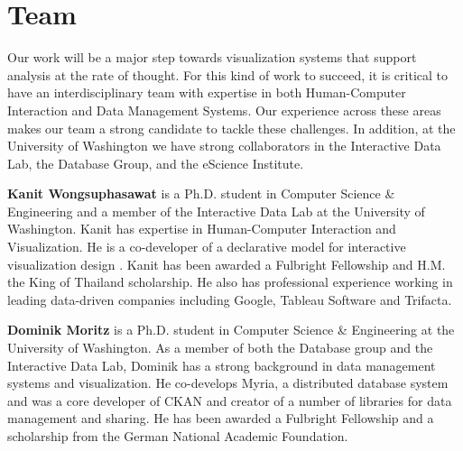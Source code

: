 \section*{Team}

Our work will be a major step towards visualization systems that support analysis at the rate of thought.  For this kind of work to succeed, it is critical to have an interdisciplinary team with expertise in both Human-Computer Interaction and Data Management Systems. Our experience across these areas makes our team a strong candidate to tackle these challenges.  In addition, at the University of Washington we have strong collaborators in the Interactive Data Lab, the Database Group, and the eScience Institute.

\textbf{Kanit Wongsuphasawat} is a Ph.D. student in Computer Science \& Engineering and a member of the Interactive Data Lab at the University of Washington.  Kanit has expertise in Human-Computer Interaction and Visualization.  He is a co-developer of a declarative model for interactive visualization design \cite{satyanarayan:reactive-vega}.  Kanit has been awarded a Fulbright Fellowship and H.M. the King of Thailand scholarship.  He also has professional experience working in leading data-driven companies including Google, Tableau Software and Trifacta.

\textbf{Dominik Moritz} is a Ph.D. student in Computer Science \& Engineering at the University of Washington.   As a member of both the Database group and the Interactive Data Lab, Dominik has a strong background in data management systems and visualization.  He co-develops Myria, a distributed database system \cite{halperin:myria} and was a core developer of CKAN and creator of a number of libraries for data management and sharing. He has been awarded a Fulbright Fellowship and a scholarship from the German National Academic Foundation.